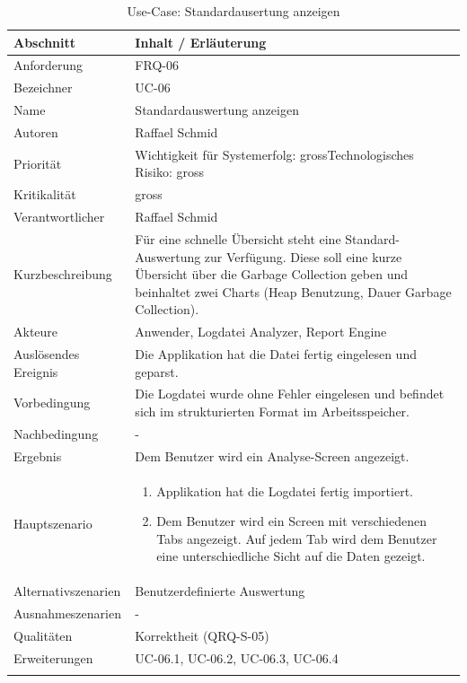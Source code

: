 \begin{longtable}{|p{4cm}|p{10.5cm}|}
\hline
   \textbf{Abschnitt} & \textbf{Inhalt / Erläuterung} \\\hline
   Anforderung & FRQ-06\\\hline
   Bezeichner & UC-06\\\hline
   Name & Standardauswertung anzeigen\\\hline
   Autoren & Raffael Schmid\\\hline
   Priorität & Wichtigkeit für Systemerfolg: gross\newline Technologisches Risiko: gross\\\hline
   Kritikalität & gross\\\hline
   Verantwortlicher & Raffael Schmid\\\hline
   Kurzbeschreibung & Für eine schnelle Übersicht steht eine Standard-Auswertung zur Verfügung. Diese soll eine kurze Übersicht über die Garbage Collection geben und beinhaltet zwei Charts (Heap Benutzung, Dauer Garbage Collection). \\\hline
   Akteure & Anwender, Logdatei Analyzer, Report Engine\\\hline
   Auslösendes Ereignis & Die Applikation hat die Datei fertig eingelesen und geparst.\\\hline
   Vorbedingung & Die Logdatei wurde ohne Fehler eingelesen und befindet sich im strukturierten Format im Arbeitsspeicher.\\\hline
   Nachbedingung & -\\\hline
   Ergebnis & Dem Benutzer wird ein Analyse-Screen angezeigt.\\\hline
   Hauptszenario & 
	\begin{enumerate}
		\item Applikation hat die Logdatei fertig importiert.
		\item Dem Benutzer wird ein Screen mit verschiedenen Tabs angezeigt. Auf jedem Tab wird dem Benutzer eine unterschiedliche Sicht auf die Daten gezeigt.
	\end{enumerate}
	\\\hline
   Alternativszenarien & Benutzerdefinierte Auswertung\\\hline
   Ausnahmeszenarien & -\\\hline
   Qualitäten & Korrektheit (QRQ-S-05)\\\hline
   Erweiterungen & UC-06.1, UC-06.2, UC-06.3, UC-06.4 \\\hline
\caption{Use-Case: Standardausertung anzeigen}
\end{longtable}

